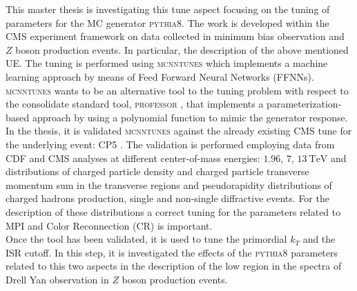 This master thesis is investigating this tune aspect focusing on the tuning of parameters for the MC generator \textsc{pythia8}. The work is developed within the CMS experiment framework on data collected in minimum bias observation and $Z$ boson production events. In particular, the description of the above mentioned UE. The tuning is performed using \textsc{mcnntunes} \cite{MCNNTUNESarticle} which implements a machine learning approach by means of Feed Forward Neural Networks (FFNNs). \textsc{mcnntunes} wants to be an alternative tool to the tuning problem with respect to the consolidate standard tool, \textsc{professor} \cite{Buckley:2009bj}, that implements a parameterization-based approach by using a polynomial function to mimic the generator response.
\\
In the thesis, it is validated \textsc{mcnntunes} against the already existing CMS tune for the underlying event: CP5 \cite{CPtunes}. The validation is performed employing data from CDF and CMS analyses at different center-of-mass energies: $1.96$, $7$, $13\ \mathrm{TeV}$ and distributions of charged particle density and charged particle transverse momentum  sum in the transverse regions and pseudorapidity distributions of charged hadrons production, single and non-single diffractive events. For the description of these distributions a correct  tuning for the parameters related to MPI and Color Reconnection (CR) is important. 
\\
Once the tool has been validated, it is used to tune the primordial $k_T$ and the ISR cutoff. In this step, it is investigated the effects of the \textsc{pythia8} parameters related to this two aspects in the description of the low region in the spectra of Drell Yan observation in $Z$ boson production events.



 
 
